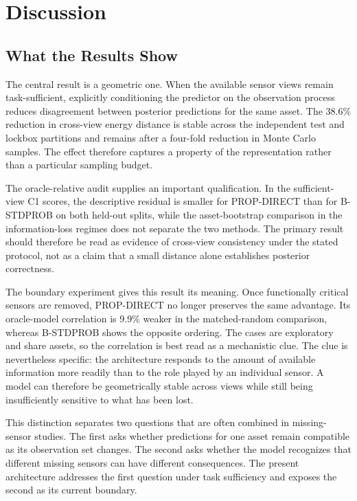\section{Discussion}
\label{sec:discussion}

\subsection{What the Results Show}

The central result is a geometric one. When the available sensor views remain task-sufficient, explicitly conditioning the predictor on the observation process reduces disagreement between posterior predictions for the same asset. The 38.6\% reduction in cross-view energy distance is stable across the independent test and lockbox partitions and remains after a four-fold reduction in Monte Carlo samples. The effect therefore captures a property of the representation rather than a particular sampling budget.

The oracle-relative audit supplies an important qualification. In the sufficient-view
C1 scores, the descriptive residual is smaller for PROP-DIRECT than for B-STDPROB
on both held-out splits, while the asset-bootstrap comparison in the information-loss
regimes does not separate the two methods. The primary result should therefore be
read as evidence of cross-view consistency under the stated protocol, not as a claim
that a small distance alone establishes posterior correctness.

The boundary experiment gives this result its meaning. Once functionally critical sensors are removed, PROP-DIRECT no longer preserves the same advantage. Its oracle-model correlation is 9.9\% weaker in the matched-random comparison, whereas B-STDPROB shows the opposite ordering. The cases are exploratory and share assets, so the correlation is best read as a mechanistic clue. The clue is nevertheless specific: the architecture responds to the amount of available information more readily than to the role played by an individual sensor. A model can therefore be geometrically stable across views while still being insufficiently sensitive to what has been lost.

This distinction separates two questions that are often combined in missing-sensor studies. The first asks whether predictions for one asset remain compatible as its observation set changes. The second asks whether the model recognizes that different missing sensors can have different consequences. The present architecture addresses the first question under task sufficiency and exposes the second as its current boundary.

